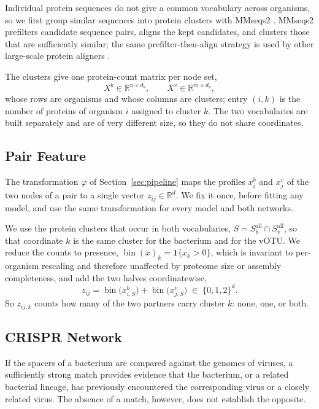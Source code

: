 Individual protein sequences do not give a common vocabulary across organisms, so we first group similar
sequences into protein clusters with MMseqs2 \citep{steinegger2017}. MMseqs2 prefilters candidate
sequence pairs, aligns the kept candidates, and clusters those that are sufficiently similar; the same
prefilter-then-align strategy is used by other large-scale protein aligners \citep{buchfink2021}.

The clusters give one protein-count matrix per node set,
\[
  X^{b}\in\mathbb{R}^{n\times d_b},
  \qquad
  X^{v}\in\mathbb{R}^{m\times d_v},
\]
whose rows are organisms and whose columns are clusters; entry \((i,k)\) is the number of proteins of
organism \(i\) assigned to cluster \(k\). The two vocabularies are built separately and are of very
different size, so they do not share coordinates.

\subsection{Pair Feature}
\label{sec:phi}

The transformation \(\varphi\) of Section~\ref{sec:pipeline} maps the profiles \(x^{b}_{i}\) and
\(x^{v}_{j}\) of the two nodes of a pair to a single vector \(z_{ij}\in\mathbb{R}^{d}\). We fix it once,
before fitting any model, and use the same transformation for every model and both networks.

We use the protein clusters that occur in both vocabularies,
\(S=S^{\mathrm{all}}_{b}\cap S^{\mathrm{all}}_{v}\), so that coordinate \(k\) is the same cluster for the
bacterium and for the vOTU. We reduce the counts to presence,
\(\operatorname{bin}(x)_k=\mathbf{1}\{x_k>0\}\), which is invariant to per-organism rescaling and
therefore unaffected by proteome size or assembly completeness, and add the two halves coordinatewise,
\begin{equation}\label{eq:phi}
  z_{ij}=\operatorname{bin}\!\bigl(x^{b}_{i,S}\bigr)+\operatorname{bin}\!\bigl(x^{v}_{j,S}\bigr)
  \;\in\;\{0,1,2\}^{d}.
\end{equation}
So \(z_{ij,k}\) counts how many of the two partners carry cluster \(k\): none, one, or both. 

\subsection{CRISPR Network}
\label{sec:crispr}
If the spacers of a bacterium are compared against the genomes of viruses, a sufficiently strong match provides 
evidence that the bacterium, or a related bacterial lineage, has previously encountered the corresponding virus 
or a closely related virus. The absence of a match, however, does not establish the opposite.

